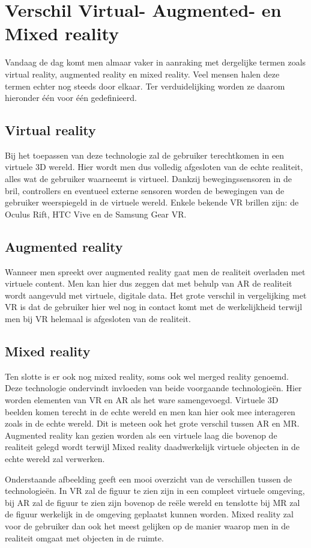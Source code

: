 \section{Verschil Virtual- Augmented- en Mixed reality}
Vandaag de dag komt men almaar vaker in aanraking met dergelijke termen zoals virtual reality, augmented reality en mixed reality. Veel mensen halen deze termen echter nog steeds door elkaar. Ter verduidelijking worden ze daarom hieronder één voor één gedefinieerd. 

\subsection{Virtual reality}
Bij het toepassen van deze technologie zal de gebruiker terechtkomen in een virtuele 3D wereld. Hier wordt men dus volledig afgesloten van de echte realiteit, alles wat de gebruiker waarneemt is virtueel. Dankzij bewegingssensoren in de bril, controllers en eventueel externe sensoren worden de bewegingen van de gebruiker weerspiegeld in de virtuele wereld. Enkele bekende VR brillen zijn: de Oculus Rift, HTC Vive en de Samsung Gear VR.

\subsection{Augmented reality}
Wanneer men spreekt over augmented reality gaat men de realiteit overladen met virtuele content. Men kan hier dus zeggen dat met behulp van AR de realiteit wordt aangevuld met virtuele, digitale data. Het grote verschil in vergelijking met VR is dat de gebruiker hier wel nog in contact komt met de werkelijkheid terwijl men bij VR helemaal is afgesloten van de realiteit.

\subsection{Mixed reality}
Ten slotte is er ook nog mixed reality, soms ook wel merged reality genoemd. Deze technologie ondervindt invloeden van beide voorgaande technologieën. Hier worden elementen van VR en AR als het ware samengevoegd. Virtuele 3D beelden komen terecht in de echte wereld en men kan hier ook mee interageren zoals in de echte wereld. Dit is meteen ook het grote verschil tussen AR en MR. Augmented reality kan gezien worden als een virtuele laag die bovenop de realiteit gelegd wordt terwijl Mixed reality daadwerkelijk virtuele objecten in de echte wereld zal verwerken.

Onderstaande afbeelding geeft een mooi overzicht van de verschillen tussen de technologieën. In VR zal de figuur te zien zijn in een compleet virtuele omgeving, bij AR zal de figuur te zien zijn bovenop de reële wereld en tenslotte bij MR zal de figuur werkelijk in de omgeving geplaatst kunnen worden. Mixed reality zal voor de gebruiker dan ook het meest gelijken op de manier waarop men in de realiteit omgaat met objecten in de ruimte.

